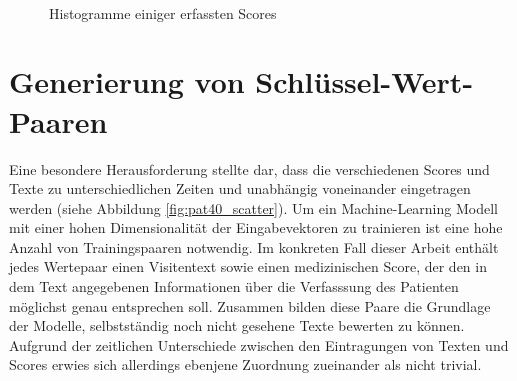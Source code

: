\begin{figure}[htb]
    \captionsetup[subfigure]{labelformat=empty, justification=centering}

    \centering
     \qquad
     \\ %
     \qquad
    \caption{Histogramme einiger erfassten Scores}
    \label{fig:score_histograms}
\end{figure}


\section{Generierung von Schlüssel-Wert-Paaren}\label{sec:pairgen}
Eine besondere Herausforderung stellte dar, dass die verschiedenen Scores und Texte zu unterschiedlichen Zeiten und unabhängig voneinander eingetragen werden (siehe Abbildung \ref{fig:pat40_scatter}).
Um ein Machine-Learning Modell mit einer hohen Dimensionalität der Eingabevektoren zu trainieren ist eine hohe Anzahl von Trainingspaaren notwendig. Im konkreten Fall dieser Arbeit enthält jedes Wertepaar einen Visitentext sowie einen medizinischen Score, der den in dem Text angegebenen Informationen über die Verfasssung des Patienten möglichst genau entsprechen soll. Zusammen bilden diese Paare die Grundlage der Modelle, selbstständig noch nicht gesehene Texte bewerten zu können. Aufgrund der zeitlichen Unterschiede zwischen den Eintragungen von Texten und Scores erwies sich allerdings ebenjene Zuordnung zueinander als nicht trivial. 


